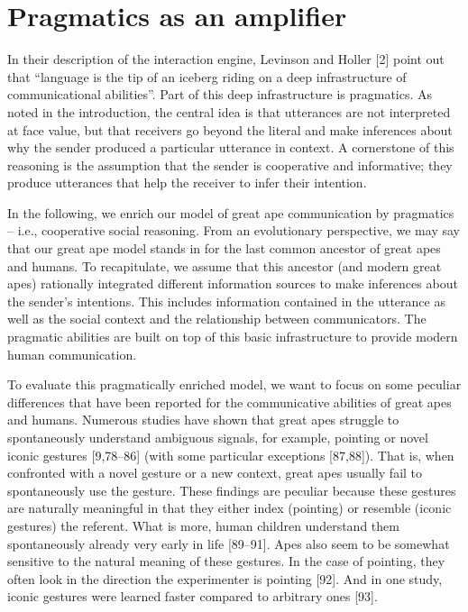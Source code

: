 \documentclass[
  man,floatsintext]{apa6}
\begin{document}
\hypertarget{pragmatics-as-an-amplifier}{%
\section{Pragmatics as an amplifier}\label{pragmatics-as-an-amplifier}}

In their description of the interaction engine, Levinson and Holler {[}2{]} point out that ``language is the tip of an iceberg riding on a deep infrastructure of communicational abilities''. Part of this deep infrastructure is pragmatics. As noted in the introduction, the central idea is that utterances are not interpreted at face value, but that receivers go beyond the literal and make inferences about why the sender produced a particular utterance in context. A cornerstone of this reasoning is the assumption that the sender is cooperative and informative; they produce utterances that help the receiver to infer their intention.

In the following, we enrich our model of great ape communication by pragmatics -- i.e., cooperative social reasoning. From an evolutionary perspective, we may say that our great ape model stands in for the last common ancestor of great apes and humans. To recapitulate, we assume that this ancestor (and modern great apes) rationally integrated different information sources to make inferences about the sender's intentions. This includes information contained in the utterance as well as the social context and the relationship between communicators. The pragmatic abilities are built on top of this basic infrastructure to provide modern human communication.

To evaluate this pragmatically enriched model, we want to focus on some peculiar differences that have been reported for the communicative abilities of great apes and humans. Numerous studies have shown that great apes struggle to spontaneously understand ambiguous signals, for example, pointing or novel iconic gestures {[}9,78--86{]} (with some particular exceptions {[}87,88{]}). That is, when confronted with a novel gesture or a new context, great apes usually fail to spontaneously use the gesture. These findings are peculiar because these gestures are naturally meaningful in that they either index (pointing) or resemble (iconic gestures) the referent. What is more, human children understand them spontaneously already very early in life {[}89--91{]}. Apes also seem to be somewhat sensitive to the natural meaning of these gestures. In the case of pointing, they often look in the direction the experimenter is pointing {[}92{]}. And in one study, iconic gestures were learned faster compared to arbitrary ones {[}93{]}.
\end{document}

